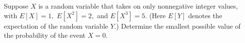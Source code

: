 Suppose $X$ is a random variable that takes on only nonnegative integer values, with $E[X]=1,$ $E[X^2]=2,$ and $E[X^3]=5.$ (Here $E[Y]$ denotes the expectation of the random variable $Y.$) Determine the smallest possible value of the probability of the event $X=0.$